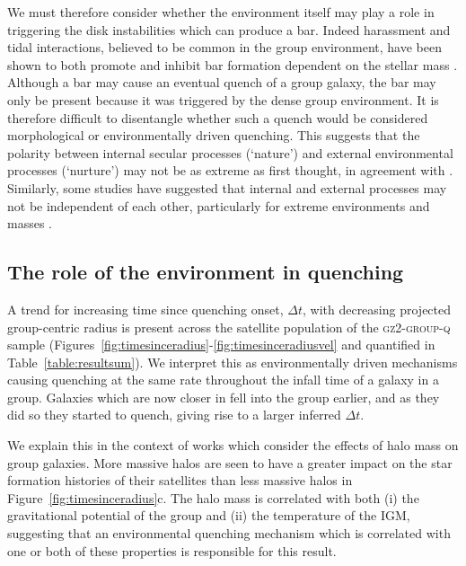 \documentclass[useAMS,usenatbib]{mn2e}
\def\minor		{\color{minorcol}}
\begin{document}
We must therefore consider whether the environment itself may play a role in triggering the disk instabilities which can produce a bar. Indeed harassment and tidal interactions, believed to be common in the group environment, have been shown to both promote and inhibit bar formation dependent on the stellar mass \citep{noguchi88, moore96, skibba12}.  {\minor Although a bar may cause an eventual quench of a group galaxy, the bar may only be present because it was triggered by the dense group environment. It is therefore difficult to disentangle whether such a quench would be considered morphological or environmentally driven quenching.} This suggests that the polarity between internal secular processes (`nature') and external environmental processes (`nurture') may not be as extreme as first thought, in agreement with \cite{skibba12}. {\minor Similarly, some studies have suggested that internal and external processes may not be independent of each other, particularly for extreme environments and masses \citep{knobel15, darvish15, carollo16}.}

\subsection{The role of the environment in quenching}\label{sec:roleenv}

A trend for increasing time since quenching onset, $\Delta t$, with decreasing projected group-centric radius is present across the satellite population of the \textsc{gz2-group-q} sample (Figures~\ref{fig:timesinceradius}-\ref{fig:timesinceradiusvel} and quantified in Table~\ref{table:resultsum}). We interpret this as environmentally driven mechanisms causing quenching at the same rate throughout the infall time of a galaxy in a group. Galaxies which are now closer in fell into the group earlier, and as they did so they started to quench, giving rise to a larger inferred $\Delta t$.

We explain this in the context of works which consider the effects of halo mass on group galaxies. More massive halos are seen to have a greater impact on the star formation histories of their satellites than less massive halos in Figure~\ref{fig:timesinceradius}c. The halo mass is correlated with both (i) the gravitational potential of the group and (ii) the temperature of the IGM, suggesting that an environmental quenching mechanism which is correlated with one or both of these properties is responsible for this result.
\end{document}
